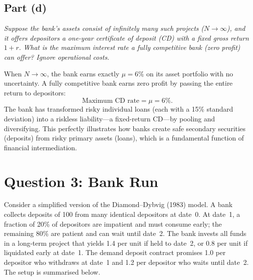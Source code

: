 \documentclass[a4paper]{article}
\begin{document}
\subsection{Part (d)}

\textit{Suppose the bank's assets consist of infinitely many such projects
(\(N \to \infty\)), and it offers depositors a one-year certificate of
deposit (CD) with a fixed gross return \(1+r\). What is the maximum
interest rate a fully competitive bank (zero profit) can offer? Ignore
operational costs.}

\medskip
When \(N \to \infty\), the bank earns exactly \(\mu = 6\%\) on its asset
portfolio with no uncertainty. A fully competitive bank earns zero profit by
passing the entire return to depositors:
\[
\text{Maximum CD rate} = \mu = 6\%.
\]
The bank has transformed risky individual loans (each with a 15\% standard
deviation) into a riskless liability---a fixed-return CD---by pooling and
diversifying. This perfectly illustrates how banks create safe secondary
securities (deposits) from risky primary assets (loans), which is a
fundamental function of financial intermediation.

\newpage
\section{Question 3: Bank Run}

Consider a simplified version of the Diamond--Dybvig (1983) model. A bank
collects deposits of 100 from many identical depositors at date~0. At
date~1, a fraction of 20\% of depositors are impatient and must consume
early; the remaining 80\% are patient and can wait until date~2. The bank
invests all funds in a long-term project that yields 1.4 per unit if held to
date~2, or 0.8 per unit if liquidated early at date~1. The demand deposit
contract promises 1.0 per depositor who withdraws at date~1 and 1.2 per
depositor who waits until date~2. The setup is summarised below.
\end{document}
